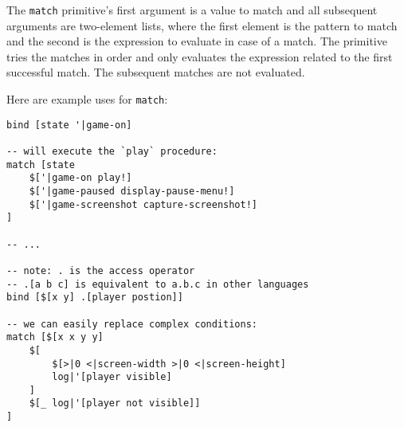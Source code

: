 The \texttt{match} primitive's first argument is a value to match and all
subsequent arguments are two-element lists, where the first element is the
pattern to match and the second is the expression to evaluate in case of a
match. The primitive tries the matches in order and only evaluates the
expression related to the first successful match. The subsequent matches are not evaluated.

Here are example uses for \texttt{match}:
\begin{lstlisting}
bind [state '|game-on]

-- will execute the `play` procedure:
match [state
    $['|game-on play!]
    $['|game-paused display-pause-menu!]
    $['|game-screenshot capture-screenshot!]
]

-- ...

-- note: . is the access operator 
-- .[a b c] is equivalent to a.b.c in other languages
bind [$[x y] .[player postion]]

-- we can easily replace complex conditions:
match [$[x x y y]
    $[
        $[>|0 <|screen-width >|0 <|screen-height]
        log|'[player visible]
    ]
    $[_ log|'[player not visible]]
]
\end{lstlisting}

